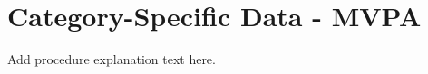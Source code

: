 \pagebreak
\chapter{Category-Specific Data - MVPA}
\label{sec:cat_spec}

Add procedure explanation text here.